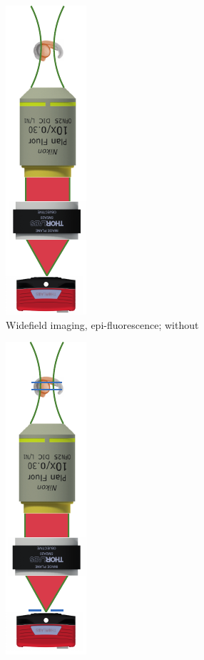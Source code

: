 \begin{figure}
	\centering
    \begin{subfigure}[t]{0.3\textwidth}
        \centering
        \includegraphics{epi_con_lsfm/widefield}
        \caption{Widefield imaging, epi-fluorescence; without }
        \label{fig:epi_con_lsfm/widefield}
    \end{subfigure}
    \hfill%
    \begin{subfigure}[t]{0.3\textwidth}
        \centering
        \includegraphics{epi_con_lsfm/confocal}

\end{subfigure}
\end{figure}
